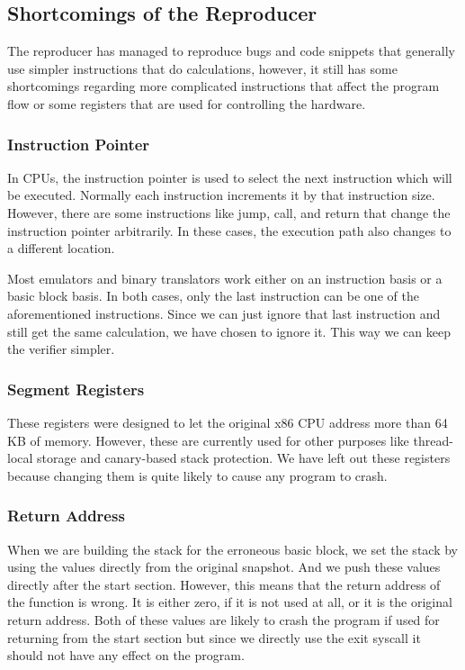 \subsection{Shortcomings of the Reproducer}
The reproducer has managed to reproduce bugs and code snippets that generally use simpler instructions that do calculations, however, it still has some shortcomings regarding more complicated instructions that affect the program flow or some registers that are used for controlling the hardware.

\subsubsection{Instruction Pointer}
In CPUs, the instruction pointer is used to select the next instruction which will be executed.
Normally each instruction increments it by that instruction size.
However, there are some instructions like jump, call, and return that change the instruction pointer arbitrarily.
In these cases, the execution path also changes to a different location.

Most emulators and binary translators work either on an instruction basis or a basic block basis.
In both cases, only the last instruction can be one of the aforementioned instructions.
Since we can just ignore that last instruction and still get the same calculation, we have chosen to ignore it.
This way we can keep the verifier simpler.

\subsubsection{Segment Registers}
These registers were designed to let the original x86 CPU address more than 64 KB of memory.
However, these are currently used for other purposes like thread-local storage and canary-based stack protection.
We have left out these registers because changing them is quite likely to cause any program to crash.

\subsubsection{Return Address}
When we are building the stack for the erroneous basic block, we set the stack by using the values directly from the original snapshot.
And we push these values directly after the start section.
However, this means that the return address of the function is wrong.
It is either zero, if it is not used at all, or it is the original return address.
Both of these values are likely to crash the program if used for returning from the start section but since we directly use the exit syscall it should not have any effect on the program.

